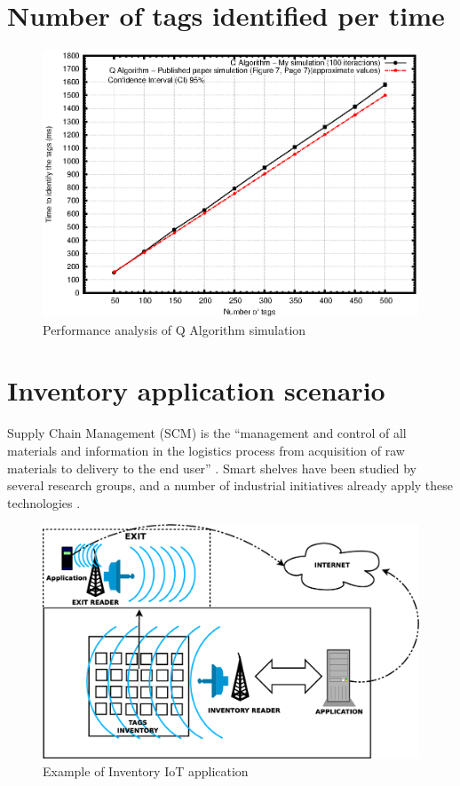\documentclass[10pt,a4paper]{article}
\begin{document}
\section{Number of tags identified per time}

\begin{figure}[!htb]
\centering
\includegraphics[scale=0.9]{imagens/identification.eps}
\caption{ {\small Performance analysis of Q Algorithm simulation}}
\label{fig:3}
\end{figure}	

\section{Inventory application scenario}

	Supply Chain Management (SCM) is the ``management and control of all materials and information in the logistics process from acquisition of raw materials to delivery to the end user'' \cite{r1}. Smart shelves have been studied by several research groups, and  a number  of  industrial initiatives already apply these technologies \cite{r2,r3,r4}.

\begin{figure}[!htb]
\centering
\includegraphics[scale=0.4]{imagens/cenario.eps}
\caption{ {\small Example of Inventory IoT application}}
\label{fig:4}
\end{figure}	
\end{document}

